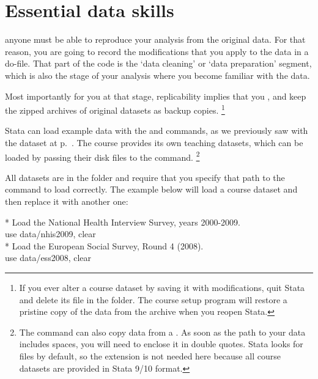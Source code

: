 %
%
\section{Essential data skills}

	 anyone must be able to reproduce your analysis from the original data. For that reason, you are going to record the modifications that you apply to the data in a do-file. That part of the code is the `data cleaning' or `data preparation' segment, which is also the stage of your analysis where you become familiar with the data.%
	
	Most importantly for you at that stage, replicability implies that you , and keep the zipped archives of original datasets as backup copies.%
		\footnote{If you ever alter a course dataset by saving it with modifications, quit Stata and delete its  file in the \data folder. The course setup program will restore a pristine copy of the data from the \ZIP archive when you reopen Stata.}%

	 Stata can load example data with the  and  commands, as we previously saw with the  dataset at p.~\pageref{lifeexp}. The course provides its own teaching datasets, which can be loaded by passing their disk files to the  command.%
		\footnote{The  command can also copy data from a \URL. As soon as the path to your data includes spaces, you will need to enclose it in double quotes. Stata looks for  files by default, so the extension is not needed here because all course datasets are provided in Stata 9/10 format.}%

	All datasets are in the \data folder and require that you specify that path to the  command to load correctly. The example below will load a course dataset and then replace it with another one:%

		\begin{docspec}
			* Load the National Health Interview Survey, years 2000-2009.\\
			use data/nhis2009, clear\\[1em]

			* Load the European Social Survey, Round 4 (2008).\\
			use data/ess2008, clear\\
		\end{docspec}

